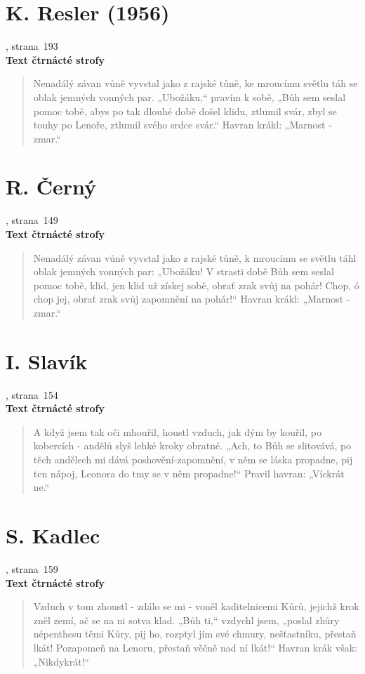 \documentclass[dp.tex]{subfiles}
\begin{document}
\section*{K. Resler (1956)}
, strana~193
\\\textbf{Text čtrnácté strofy}
\begin{verse}
Nenadálý závan vůně vyvstal jako z rajské tůně,
ke mroucímu světlu táh se oblak jemných vonných par.
„Ubožáku,“ pravím k sobě, „Bůh sem seslal pomoc tobě,
abys po tak dlouhé době došel klidu, ztlumil svár,
zbyl se touhy po Lenoře, ztlumil svého srdce svár.“
Havran krákl: „Marnost - zmar.“
\end{verse}

\section*{R. Černý}
, strana~149
\\\textbf{Text čtrnácté strofy}
\begin{verse}
Nenadálý závan vůně vyvstal jako z rajské tůně,
k mroucímu se světlu táhl oblak jemných vonných par:
„Ubožáku! V strasti době Bůh sem seslal pomoc tobě,
klid, jen klid už získej sobě, obrať zrak svůj na pohár!
Chop, ó chop jej, obrať zrak svůj zapomnění na pohár!“
Havran krákl: „Marnost - zmar.“
\end{verse}

\section*{I. Slavík}
, strana~154
\\\textbf{Text čtrnácté strofy}
\begin{samepage}
\begin{verse}
A když jsem tak oči mhouřil, houstl vzduch, jak dým by kouřil,
po kobercích - andělů slyš lehké kroky obratné.
„Ach, to Bůh se slitovává, po těch andělech mi dává
poshovění-zapomnění, v něm se láska propadne,
pij ten nápoj, Leonora do tmy se v něm propadne!“
Pravil havran: „Víckrát ne.“
\end{verse}
\end{samepage}

\section*{S. Kadlec}
, strana~159
\\\textbf{Text čtrnácté strofy}
\begin{verse}
Vzduch v tom zhoustl - zdálo se mi - voněl kaditelnicemi
Kůrů, jejichž krok zněl zemí, ač se na ni sotva klad.
 „Bůh ti,“ vzdychl jsem,  „poslal zhůry népenthesu těmi Kůry,
pij ho, rozptyl jím své chmury, nešťastníku, přestaň lkát!
Pozapomeň na Lenoru, přestaň věčně nad ní lkát!“
Havran krák však: „Nikdykrát!“
\end{verse}
\end{document}
